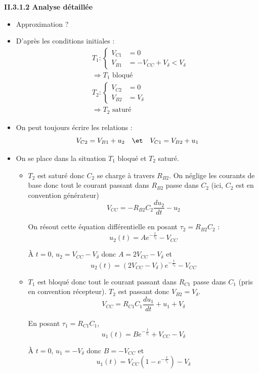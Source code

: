 \documentclass[../../Cours_M1.tex]{subfiles}
\begin{document}
\textbf{II.3.1.2 Analyse détaillée}

\begin{itemize}
\item Approximation ?
\item D'après les conditions initiales :
\begin{align*}
& T_1 : \left\{
\begin{array}{ll}
V_{C1} & = 0 \\
V_{B1} & = - V_{CC} + V_{\delta} < V_{\delta}
\end{array}
\right. \\
& \Rightarrow T_1 \text{ bloqué } \\
& T_2 : \left\{
\begin{array}{ll}
V_{C2} & = 0 \\
V_{B2} & = V_{\delta}
\end{array}
\right. \\
& \Rightarrow T_2 \text{ saturé }
\end{align*}

\item On peut toujours écrire les relations : \[V_{C2} = V_{B1} + u_2 \quad \et \quad V_{C1} = V_{B2} + u_1 \]

\item On se place dans la situation $T_1$ bloqué et $T_2$ saturé.

\begin{itemize}
\item  $T_2$ est saturé donc $C_2$ se charge à travers $R_{B2}$. On néglige les courants de base donc tout le courant passant dans $R_{B2} $ passe dans $C_2$ (ici, $C_2$ est en convention générateur)
\[ V_{CC} = -R_{B2}C_2\frac{du_2}{dt} -u_2\]

On résout cette équation différentielle en posant $\tau_2 = R_{B2}C_2$ :
\[ u_2(t) = A e^{-\frac{t}{\tau_2}} - V_{CC} \]

À $t=0$, $u_2=V_{CC}-V_{\delta}$ donc $A=2V_{CC}-V_{\delta}$ et \[\boxed{u_2(t) = (2V_{CC}-V_{\delta})e^{-\frac{t}{\tau_2}} - V_{CC}} \]


\item $T_1$ est bloqué donc tout le courant passant dans $R_{C1}$ passe dans $C_1$ (pris en convention récepteur). $T_2$ est passant donc $V_{B2} = V_{\delta}$.
\[ V_{CC} = R_{C1}C_1\frac{du_1}{dt}  + u_1 + V_{\delta}\]

En posant $\tau_1 = R_{C1}C_1$,
\[u_1(t) = B e^{-\frac{t}{\tau_1}} + V_{CC}-V_{\delta}\]

À $t=0$, $u_1 = -V_{\delta}$ donc $B=-V_{CC}$ et
\[\boxed{u_1(t) = V_{CC}(1-e^{-\frac{t}{\tau_1}})-V_{\delta}} \]
\end{itemize}



\end{itemize}
\end{document}

